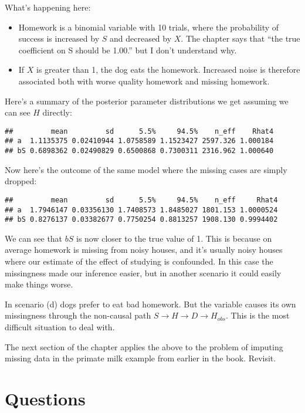 \documentclass[
]{book}
\providecommand{\tightlist}{%
  \setlength{\itemsep}{0pt}\setlength{\parskip}{0pt}}
\begin{document}
What's happening here:

\begin{itemize}
\tightlist
\item
  Homework is a binomial variable with 10 trials, where the probability of success is increased by \(S\) and decreased by \(X\). The chapter says that ``the true coefficient on S should be 1.00.'' but I don't understand why.
\item
  If \(X\) is greater than 1, the dog eats the homework. Increased noise is therefore associated both with worse quality homework and missing homework.
\end{itemize}

Here's a summary of the posterior parameter distributions we get assuming we can see \(H\) directly:

\begin{verbatim}
##         mean         sd      5.5%     94.5%    n_eff    Rhat4
## a  1.1135375 0.02410944 1.0758589 1.1523427 2597.326 1.000184
## bS 0.6898362 0.02490829 0.6500868 0.7300311 2316.962 1.000640
\end{verbatim}

Now here's the outcome of the same model where the missing cases are simply dropped:

\begin{verbatim}
##         mean         sd      5.5%     94.5%    n_eff     Rhat4
## a  1.7946147 0.03356130 1.7408573 1.8485027 1801.153 1.0000524
## bS 0.8276137 0.03382677 0.7750254 0.8813257 1908.130 0.9994402
\end{verbatim}

We can see that \(bS\) is now closer to the true value of 1. This is because on average homework is missing from noisy houses, and it's usually noisy houses where our estimate of the effect of studying is confounded. In this case the missingness made our inference easier, but in another scenario it could easily make things worse.

In scenario (d) dogs prefer to eat bad homework. But the variable causes its own missingness through the non-causal path \(S \rightarrow H \rightarrow D \rightarrow H_{obs}\). This is the most difficult situation to deal with.

The next section of the chapter applies the above to the problem of imputing missing data in the primate milk example from earlier in the book. Revisit.

\hypertarget{questions-14}{%
\section{Questions}\label{questions-14}}
\end{document}

